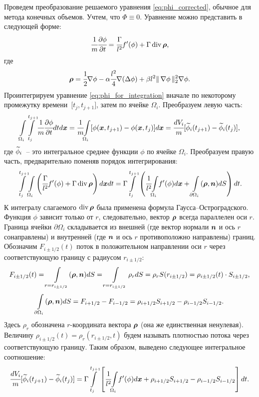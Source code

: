 Проведем преобразование решаемого уравнения \eqref{eq:phi_corrected}, обычное для метода конечных объемов. Учтем, что $\Phi \equiv 0$. Уравнение можно представить в следующей форме:
\begin{equation}
	\cfrac{1}{m} \cfrac{\partial \phi}{\partial t} = \cfrac{\Gamma}{l^2} f'(\phi) + \Gamma \operatorname{{div}} {\boldsymbol{\rho}} {\text{,}}
	\label{eq:phi_for_integration}
\end{equation}
где
\begin{equation}
	{\boldsymbol{\rho}} = \cfrac{1}{2} \nabla \phi - \alpha \cfrac{l^2}{4} \nabla (\Delta \phi) + \beta l^2 \| \, \nabla \phi \, \|_2^2 \nabla \phi {\text{.}}
	\label{eq:rho}
\end{equation}
Проинтегрируем уравнение \eqref{eq:phi_for_integration} вначале по некоторому промежутку времени~[$t_j, t_{j + 1}]$, затем по ячейке $\Omega_i$. Преобразуем левую часть:
$${\int\limits_{\Omega_i}} {\int\limits_{t_j}^{t_{j + 1}}} \cfrac{1}{m} \cfrac{\partial \phi}{\partial t} dt d {\boldsymbol{x}} = \cfrac{1}{m} {\int\limits_{\Omega_i}} [\phi({\boldsymbol{x}}, t_{j + 1}) - \phi({\boldsymbol{x}}, t_j)] d {\boldsymbol{x}} = \cfrac{dV_i}{m} [{\widetilde{\phi}}_i(t_{j + 1}) - {\widetilde{\phi}}_i(t_j)] {\text{,}}$$
где ${\widetilde{\phi}}_i$~-- это интегральное среднее функции $\phi$ по ячейке $\Omega_i$. Преобразуем правую часть, предварительно поменяв порядок интегрирования:
$${\int\limits_{t_j}^{t_{j + 1}}} {\int\limits_{\Omega_i}} \left( \cfrac{\Gamma}{l^2} f'(\phi) + \Gamma \operatorname{{div}} {\boldsymbol{\rho}} \right) d {\boldsymbol{x}} dt = \Gamma {\int\limits_{t_j}^{t_{j + 1}}} \left( \cfrac{1}{l^2} {\int\limits_{\Omega_i}} f'(\phi) d {\boldsymbol{x}} + \int\limits_{\partial \Omega_i} ({\boldsymbol{\rho}}, {\boldsymbol{n}}) dS \right) dt {\text{.}}$$
К интегралу слагаемого $\operatorname{{div}} {\boldsymbol{\rho}}$ была применена формула Гаусса--Остроград\-ского. Функция $\phi$ зависит только от $r$, следовательно, вектор ${\boldsymbol{\rho}}$ всегда параллелен оси $r$. Граница ячейки $\partial \Omega_i$ складывается из внешней (где вектор нормали ${\boldsymbol{n}}$ и ось $r$ сонаправлены) и внутренней (где ${\boldsymbol{n}}$ и ось $r$ противоположно направлены) границ. Обозначим $F_{i \pm 1/2}(t)$ поток в положительном направлении оси $r$ через соответствующую границу с радиусом $r_{i \pm 1/2}$:
$$F_{i \pm 1/2}(t) = \int\limits_{r = r_{i \pm 1/2}} ({\boldsymbol{\rho}}, {\boldsymbol{n}}) dS = \int\limits_{r = r_{i \pm 1/2}} \rho_r dS = \rho_r S(r_{i \pm 1/2}) = \rho_{i \pm 1/2}(t) \cdot S_{i \pm 1/2} {\text{,}}$$
$$\int\limits_{\partial \Omega_i} ({\boldsymbol{\rho}}, {\boldsymbol{n}}) dS = F_{i + 1/2} - F_{i - 1/2} = \rho_{i + 1/2} S_{i + 1/2} - \rho_{i - 1/2} S_{i - 1/2} {\text{.}}$$
Здесь $\rho_r$ обозначена $r$-координата вектора ${\boldsymbol{\rho}}$ (она же единственная ненулевая). Величину $\rho_{i \pm 1/2}(t) = \rho_r(r_{i \pm 1/2}, t)$ будем называть плотностью потока через соответствующую границу. Таким образом, выведено следующее интегральное соотношение:
\begin{equation}
	\cfrac{dV_i}{m} [{\widetilde{\phi}}_i(t_{j + 1}) - {\widetilde{\phi}}_i(t_j)] = \Gamma {\int\limits_{t_j}^{t_{j + 1}}} \left[ \cfrac{1}{l^2} {\int\limits_{\Omega_i}} f'(\phi) d {\boldsymbol{x}} + \rho_{i + 1/2} S_{i + 1/2} - \rho_{i - 1/2} S_{i - 1/2} \right] dt {\text{.}}
	\label{eq:finite_volume_integral}
\end{equation}

